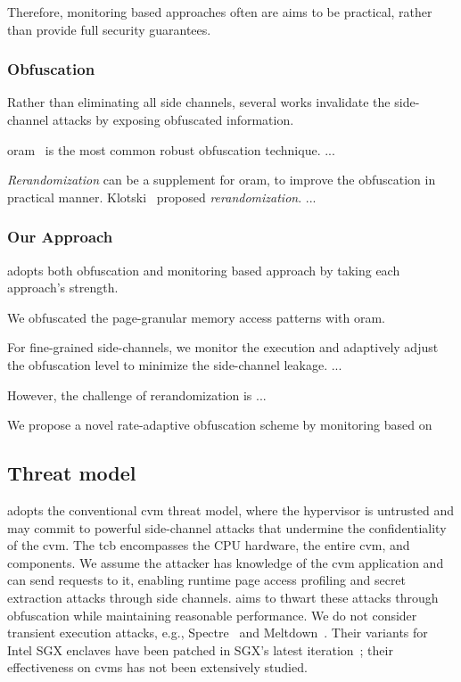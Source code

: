 Therefore, monitoring based approaches often are aims to be practical, rather than provide full security guarantees.

\subsubsection{Obfuscation}
Rather than eliminating all side channels, several works invalidate the side-channel attacks by exposing obfuscated information.

\gls{oram}~\cite{zhang2020klotski,obelix,ahmad2019obfuscuro} is the most common robust obfuscation technique. ...

\emph{Rerandomization} can be a supplement for \gls{oram}, to improve the obfuscation in practical manner.
Klotski~\cite{zhang2020klotski} proposed \emph{rerandomization}. ...



\subsubsection{Our Approach}
\thename adopts both obfuscation and monitoring based approach by taking each approach's strength.

We obfuscated the page-granular memory access patterns with \gls{oram}.

For fine-grained side-channels, we monitor the execution and adaptively adjust the obfuscation level to minimize the side-channel leakage. ...

However, the challenge of rerandomization is ...

We propose a novel rate-adaptive obfuscation scheme by monitoring based on 
\fi


\subsection{Threat model}
\label{subsec:threat-model}
\thename adopts the conventional \gls{cvm} threat model, where the hypervisor is untrusted and may commit to powerful side-channel attacks that undermine the confidentiality of the \gls{cvm}.
The \gls{tcb} encompasses the CPU hardware, the entire \gls{cvm}, and \thename components.
We assume the attacker has knowledge of the \gls{cvm} application and can send requests to it, enabling runtime page access profiling and secret extraction attacks through side channels.
\thename aims to thwart these attacks through obfuscation while maintaining reasonable performance.
We do not consider transient execution attacks, e.g., Spectre~\cite{kocher2019spectre} and Meltdown~\cite{lipp2018meltdown}.
Their variants for Intel SGX enclaves have been patched in SGX's latest iteration~\cite{sgxspectre,foreshadow}; their effectiveness on \glspl{cvm} has not been extensively studied.





